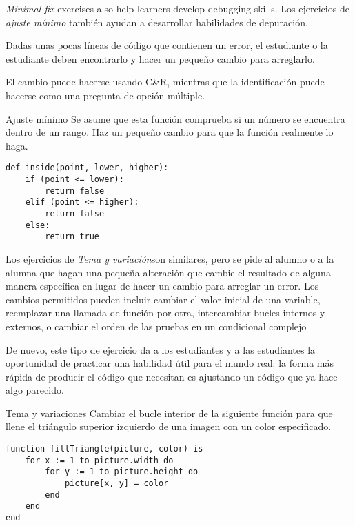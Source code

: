 \emph{Minimal fix} exercises also help learners develop debugging skills.
Los ejercicios de \emph{ajuste mínimo} también ayudan a desarrollar habilidades de depuración.

Dadas unas pocas líneas de código que contienen un error, el estudiante o la estudiante deben encontrarlo y hacer un pequeño cambio para arreglarlo.

El cambio puede hacerse usando C\&R,
mientras que la identificación puede hacerse como una pregunta de opción múltiple.


\begin{aside}{Ajuste mínimo}
 Se asume que esta función comprueba 
 si un número se encuentra dentro de un rango.
 Haz un pequeño cambio para que la función realmente lo haga.

\begin{verbatim}
def inside(point, lower, higher):
    if (point <= lower):
        return false
    elif (point <= higher):
        return false
    else:
        return true
\end{verbatim}
\end{aside}

Los ejercicios de \emph{Tema y variación}son similares, 
pero se pide al alumno o a la alumna que hagan una pequeña alteración que cambie el resultado de alguna manera específica 
en lugar de hacer un cambio para arreglar un error.
Los cambios permitidos pueden incluir cambiar el valor inicial de una variable, 
reemplazar una llamada de función por otra, 
intercambiar bucles internos y externos,
o cambiar el orden de las pruebas en un condicional complejo

De nuevo,
este tipo de ejercicio da a los estudiantes y a las estudiantes la oportunidad de practicar una habilidad útil para el mundo real:
la forma más rápida de producir el código que necesitan 
es ajustando un código que ya hace algo parecido.

\begin{aside}{Tema y variaciones}
  Cambiar el bucle interior de la siguiente 
  función para que llene el triángulo superior izquierdo de una imagen
  con un color especificado.

\begin{verbatim}
function fillTriangle(picture, color) is
    for x := 1 to picture.width do
        for y := 1 to picture.height do
            picture[x, y] = color
        end
    end
end
\end{verbatim}
\end{aside}

